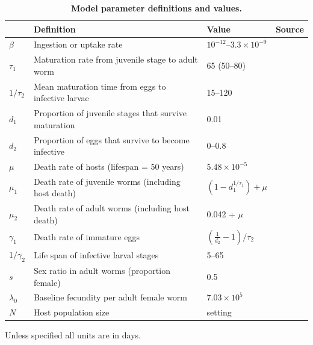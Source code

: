 \begin{table}[!ht]
\centering
\caption{
{\bf Model parameter definitions and values.}}
\begin{tabular}{|l|l|l|l|}
\hline
\multicolumn{1}{|l|}{\bf} & \multicolumn{1}{|l|}{\bf Definition} &
\multicolumn{1}{|l|}{\bf Value} &
\multicolumn{1}{|l|}{\bf Source} \\ \hline
$\beta$ & Ingestion or uptake rate & $10^{-12}$--$3.3\times10^{-9}$ & \\ \hline
$\tau_1$ & Maturation rate from juvenile stage to adult worm & 65 (50--80) & \cite{Anderson1992} \\ \hline
$1/\tau_2$ & Mean maturation time from eggs to infective larvae & 15--120 & \cite{Wagner,Arene,Kim} \\ \hline
$d_1$ & Proportion of juvenile stages that survive maturation & 0.01 & \cite{Anderson1992} \\ \hline
$d_2$ & Proportion of eggs that survive to become infective & 0--0.8 & \cite{Arene} \\ \hline
$\mu$ & Death rate of hosts (lifespan = 50 years) & $5.48\times 10^{-5}$  &  \\ \hline
$\mu_1$ & Death rate of juvenile worms (including host death) & $(1-d_1^{1/\tau_1}) + \mu$ &  \\ \hline
$\mu_2$ & Death rate of adult worms (including host death) & 0.042 + $\mu$ & \cite{Anderson1992} \\ \hline
$\gamma_1$ & Death rate of immature eggs & $(\frac{1}{d_2}-1)/\tau_2$ &  \\ \hline
$1/\gamma_2$ & Life span of infective larval stages & 5--65 & \cite{Arene} \\ \hline
$s$ & Sex ratio in adult worms (proportion female) & 0.5 & \cite{Anderson1992} \\ \hline
$\lambda_0$ & Baseline fecundity per adult female worm & $7.03\times 10^5$ & \cite{Churcher} \\ \hline
$N$ & Host population size & setting & \\ \hline
\end{tabular}
\begin{flushleft} Unless specified all units are in days.
\end{flushleft}
\label{table:paramSTH}
\end{table}

